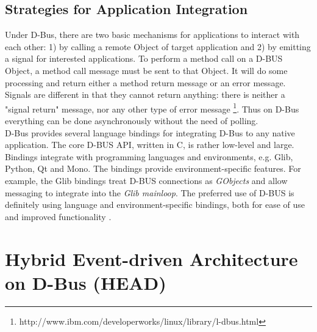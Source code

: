 \documentclass{ifacconf}
\begin{document}
\subsection{Strategies for Application Integration}
Under D-Bus, there are two basic mechanisms for applications to interact with each other: 1) by calling a remote Object of target application and 2) by emitting a signal for interested applications. To perform a method call on a D-BUS Object, a method call message must be sent to that Object. It will do some processing and return either a method return message or an error message. Signals are different in that they cannot return anything: there is neither a "signal return" message, nor any other type of error message  \footnote{http://www.ibm.com/developerworks/linux/library/l-dbus.html}. Thus on D-Bus everything can be done asynchronously without the need of polling.\\ 
D-Bus provides several language bindings for integrating D-Bus to any native application. The core D-BUS API, written in C, is rather low-level and large. Bindings integrate with programming languages and environments, e.g. Glib, Python, Qt and Mono. The bindings provide environment-specific features. For example, the Glib bindings treat D-BUS connections as {\em GObjects} and allow messaging to integrate into the {\em Glib mainloop}. The preferred use of D-BUS is definitely using language and environment-specific bindings, both for ease of use and improved functionality \citep{Love2005}.
\section{Hybrid Event-driven Architecture on D-Bus (HEAD)}
\label{sec:head}
\end{document}

